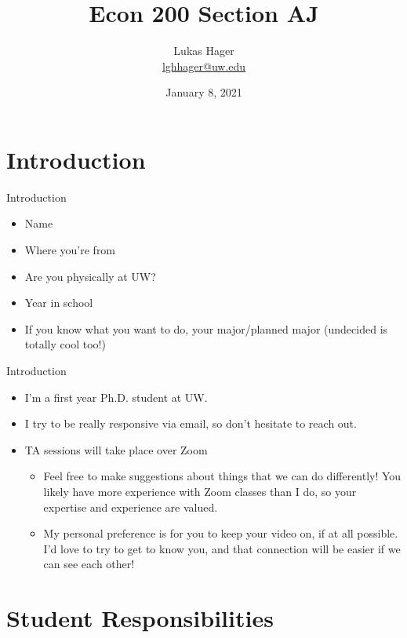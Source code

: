 \documentclass{beamer}
\title{Econ 200 Section AJ}
\author{Lukas Hager \\ \href{mailto:lghhager@uw.edu}{lghhager@uw.edu}}
\institute{Office Hours: Monday 8-9, Thursday 3:30-4:30}
\date{January 8, 2021}
\begin{document}
\begin{frame}
  \titlepage
\end{frame}


\section{Introduction}

\begin{frame}{Introduction}

\begin{itemize}
  \item Name
  \item Where you're from
  \item Are you physically at UW?
  \item Year in school
  \item If you know what you want to do, your major/planned major (undecided is totally cool too!)
\end{itemize}

\end{frame}

\begin{frame}{Introduction}

\begin{itemize}
  \item I'm a first year Ph.D. student at UW.
  \item I try to be really responsive via email, so don't hesitate to reach out.
  \item TA sessions will take place over Zoom
  \begin{itemize}
      \item Feel free to make suggestions about things that we can do differently! You likely have more experience with Zoom classes than I do, so your expertise and experience are valued.
      \item My personal preference is for you to keep your video on, if at all possible. I'd love to try to get to know you, and that connection will be easier if we can see each other!
  \end{itemize}
\end{itemize}

\end{frame}

\section{Student Responsibilities}
\end{document}
